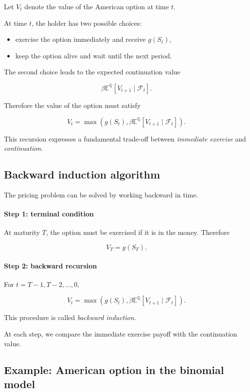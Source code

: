 \documentclass[11pt]{article}
\newcommand{\Qbb}{\mathbb{Q}}
\newcommand{\E}{\mathbb{E}}
\theoremstyle{definition}
\theoremstyle{plain}
\begin{document}
Let \(V_t\) denote the value of the American option at time \(t\).

At time \(t\), the holder has two possible choices:

\begin{itemize}[leftmargin=1.4em]
\item exercise the option immediately and receive \(g(S_t)\),
\item keep the option alive and wait until the next period.
\end{itemize}

The second choice leads to the expected continuation value

\[
\beta \E^{\Qbb}[V_{t+1} \mid \mathcal{F}_t].
\]

Therefore the value of the option must satisfy

\[
V_t
=
\max
\left(
g(S_t),
\beta \E^{\Qbb}[V_{t+1} \mid \mathcal{F}_t]
\right).
\]

This recursion expresses a fundamental trade-off between
\emph{immediate exercise} and \emph{continuation}.

\subsection{Backward induction algorithm}

The pricing problem can be solved by working backward in time.

\paragraph{Step 1: terminal condition}

At maturity \(T\), the option must be exercised if it is in the money.
Therefore

\[
V_T = g(S_T).
\]

\paragraph{Step 2: backward recursion}

For \(t=T-1,T-2,\dots,0\),

\[
V_t
=
\max
\left(
g(S_t),
\beta \E^{\Qbb}[V_{t+1} \mid \mathcal{F}_t]
\right).
\]

This procedure is called \emph{backward induction}.

At each step, we compare the immediate exercise payoff with the
continuation value.

\subsection{Example: American option in the binomial model}
\end{document}

